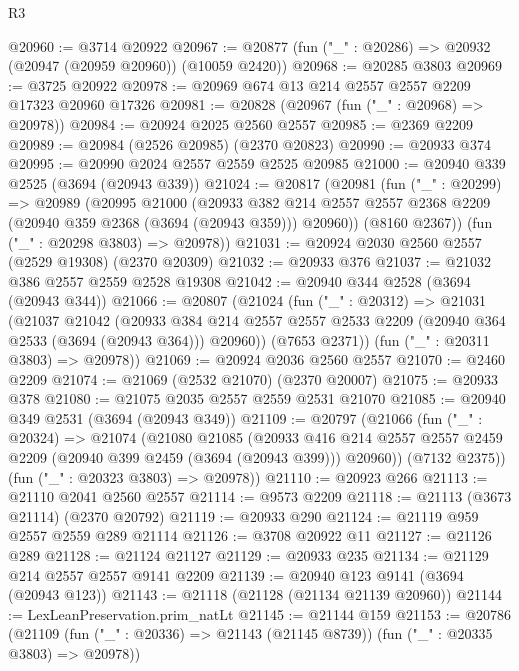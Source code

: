 \begin{lexlean}{R3}
\begin{coremodule}
@20960 := @3714 @20922
@20967 := @20877 (fun ("_" : @20286) => @20932 (@20947 (@20959 @20960)) (@10059 @2420))
@20968 := @20285 @3803
@20969 := @3725 @20922
@20978 := @20969 @674 @13 @214 @2557 @2557 @2209 @17323 @20960 @17326
@20981 := @20828 (@20967 (fun ("_" : @20968) => @20978))
@20984 := @20924 @2025 @2560 @2557
@20985 := @2369 @2209
@20989 := @20984 (@2526 @20985) (@2370 @20823)
@20990 := @20933 @374
@20995 := @20990 @2024 @2557 @2559 @2525 @20985
@21000 := @20940 @339 @2525 (@3694 (@20943 @339))
@21024 := @20817
    (@20981
      (fun ("_" : @20299) =>
      @20989
        (@20995
          @21000
          (@20933
            @382
            @214
            @2557
            @2557
            @2368
            @2209
            (@20940 @359 @2368 (@3694 (@20943 @359)))
            @20960))
        (@8160 @2367))
      (fun ("_" : @20298 @3803) => @20978))
@21031 := @20924 @2030 @2560 @2557 (@2529 @19308) (@2370 @20309)
@21032 := @20933 @376
@21037 := @21032 @386 @2557 @2559 @2528 @19308
@21042 := @20940 @344 @2528 (@3694 (@20943 @344))
@21066 := @20807
    (@21024
      (fun ("_" : @20312) =>
      @21031
        (@21037
          @21042
          (@20933
            @384
            @214
            @2557
            @2557
            @2533
            @2209
            (@20940 @364 @2533 (@3694 (@20943 @364)))
            @20960))
        (@7653 @2371))
      (fun ("_" : @20311 @3803) => @20978))
@21069 := @20924 @2036 @2560 @2557
@21070 := @2460 @2209
@21074 := @21069 (@2532 @21070) (@2370 @20007)
@21075 := @20933 @378
@21080 := @21075 @2035 @2557 @2559 @2531 @21070
@21085 := @20940 @349 @2531 (@3694 (@20943 @349))
@21109 := @20797
    (@21066
      (fun ("_" : @20324) =>
      @21074
        (@21080
          @21085
          (@20933
            @416
            @214
            @2557
            @2557
            @2459
            @2209
            (@20940 @399 @2459 (@3694 (@20943 @399)))
            @20960))
        (@7132 @2375))
      (fun ("_" : @20323 @3803) => @20978))
@21110 := @20923 @266
@21113 := @21110 @2041 @2560 @2557
@21114 := @9573 @2209
@21118 := @21113 (@3673 @21114) (@2370 @20792)
@21119 := @20933 @290
@21124 := @21119 @959 @2557 @2559 @289 @21114
@21126 := @3708 @20922 @11
@21127 := @21126 @289
@21128 := @21124 @21127
@21129 := @20933 @235
@21134 := @21129 @214 @2557 @2557 @9141 @2209
@21139 := @20940 @123 @9141 (@3694 (@20943 @123))
@21143 := @21118 (@21128 (@21134 @21139 @20960))
@21144 := LexLeanPreservation.prim_natLt
@21145 := @21144 @159
@21153 := @20786
    (@21109 (fun ("_" : @20336) => @21143 (@21145 @8739)) (fun ("_" : @20335 @3803) => @20978))

\end{coremodule}
\end{lexlean}
